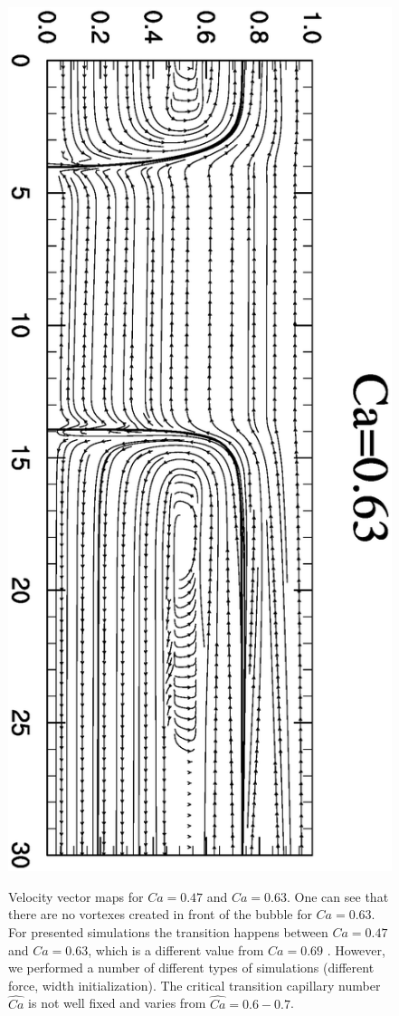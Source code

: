 \documentclass[preprint,12pt]{elsarticle}
\begin{document}
\begin{figure}[ht]
\includegraphics[angle=90,width=\textwidth]{Figures/stream_ca63.eps}\\
\caption{Velocity vector maps for $Ca=0.47$ and $Ca=0.63$. One can see that there are no vortexes
created
in front of the bubble for $Ca=0.63$. For presented simulations the transition happens between
$Ca=0.47$ and $Ca=0.63$, which
is a different value from $Ca=0.69$ \cite{heil-threedim}. However, we performed a number of
different types of simulations (different force, width initialization). The critical transition
capillary number $\widehat{Ca}$ is not well fixed and varies from $\widehat{Ca}=0.6-0.7$.  
\label{fig:streamlines:pattern}}
\end{figure}
\end{document}
